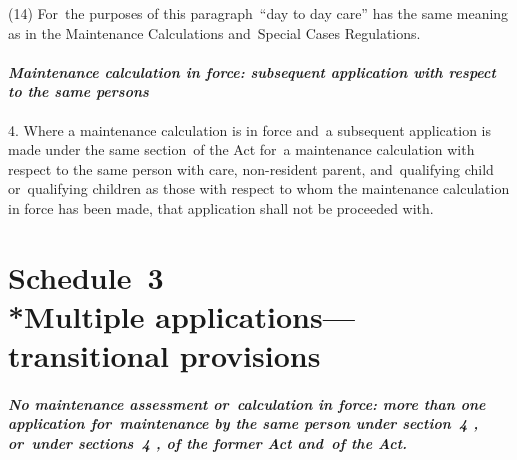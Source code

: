 \documentclass[12pt,a4paper]{article}
\begin{document}
(14) For~the purposes of this paragraph~“day to day care” has the same meaning as in the Maintenance Calculations and~Special Cases Regulations.


\subsection*{\itshape Maintenance calculation in force: subsequent application with respect to the same persons}

4.  Where a maintenance calculation is in force and~a subsequent application is made 
under the same section~of the Act for~a maintenance calculation with respect to the same person with care, non-resident parent, and~qualifying child or~qualifying children as those with respect to whom the maintenance calculation in force has been made, that application shall not be proceeded with. 


\part[Schedule~3 --- Multiple applications---transitional provisions]{Schedule~3\\*Multiple applications---\hspace{0pt}transitional provisions}

\renewcommand\parthead{--- Schedule~3}


\subsection*{\itshape\sloppy No maintenance assessment or~calculation in force: more than one application for~maintenance by the same person under section~4%
, or~under sections~4%
, of the former Act and~of the Act.}
\end{document}
